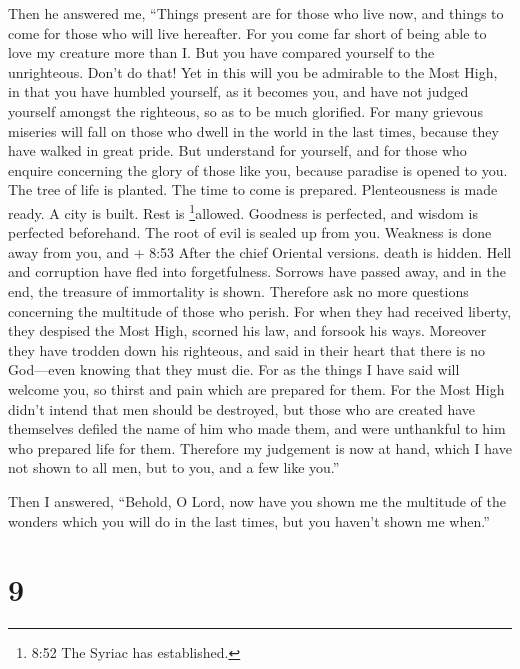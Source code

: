  Then he answered me, ``Things present are for those who
live now, and things to come for those who will live hereafter.
 For you come far short of being able to love my creature
more than I. But you have compared yourself to the unrighteous. Don't do
that!  Yet in this will you be admirable to the Most High,
 in that you have humbled yourself, as it becomes you, and
have not judged yourself amongst the righteous, so as to be much
glorified.  For many grievous miseries will fall on those
who dwell in the world in the last times, because they have walked in
great pride.  But understand for yourself, and for those
who enquire concerning the glory of those like you, 
because paradise is opened to you. The tree of life is planted. The time
to come is prepared. Plenteousness is made ready. A city is built. Rest
is \footnote{8:52 The Syriac has established.}allowed. Goodness is
perfected, and wisdom is perfected beforehand.  The root of
evil is sealed up from you. Weakness is done away from you, and + 8:53
After the chief Oriental versions. death is hidden. Hell and corruption
have fled into forgetfulness.  Sorrows have passed away,
and in the end, the treasure of immortality is shown. 
Therefore ask no more questions concerning the multitude of those who
perish.  For when they had received liberty, they despised
the Most High, scorned his law, and forsook his ways. 
Moreover they have trodden down his righteous,  and said in
their heart that there is no God---even knowing that they must die.
 For as the things I have said will welcome you, so thirst
and pain which are prepared for them. For the Most High didn't intend
that men should be destroyed,  but those who are created
have themselves defiled the name of him who made them, and were
unthankful to him who prepared life for them.  Therefore my
judgement is now at hand,  which I have not shown to all
men, but to you, and a few like you.''

Then I answered,  ``Behold, O Lord, now have you shown me
the multitude of the wonders which you will do in the last times, but
you haven't shown me when.''

\hypertarget{section-8}{%
\section{9}\label{section-8}}

